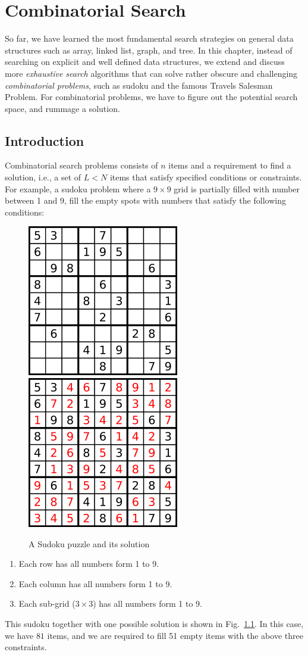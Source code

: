 \documentclass[../main.tex]{subfiles}
\begin{document}
\chapter{Combinatorial Search}
So far, we have learned the most fundamental search strategies on general data structures such as array, linked list, graph, and tree. In this chapter, instead of searching on explicit and well defined data structures, we extend and discuss more \textit{exhaustive search} algorithms that can solve rather obscure and challenging \textit{combinatorial problems}, such as sudoku and the famous Travels Salesman Problem. For combinatorial problems, we have to figure out the potential search space, and rummage a solution. 
\section{Introduction}
Combinatorial search problems consists of $n$ items and a requirement to find a solution, i.e., a set of $L < N$ items that satisfy specified conditions or constraints. For example, a sudoku problem where a $9\times 9$ grid is partially filled with number between 1 and 9, fill the empty spots with numbers that satisfy the following conditions:
\begin{figure}[!ht]
    \centering
    \includegraphics[width= 0.35\columnwidth]{fig/250px-Sudoku-by-L2G-20050714.png}
    \includegraphics[width= 0.35\columnwidth]{fig/250px-Sudoku-by-L2G-20050714_solution.png}
    \caption{A Sudoku puzzle and its solution}
    \label{fig:backtrack_puzzle_1}
\end{figure}
\begin{enumerate}
    \item Each row has all numbers form 1 to 9.
    \item Each column has all numbers form 1 to 9.
    \item Each sub-grid ($3 \times3$) has all numbers form 1 to 9.
\end{enumerate}
This sudoku together with one possible solution is shown in Fig.~\ref{fig:backtrack_puzzle_1}. In this case, we have $81$ items, and we are required to fill 51 empty items with the above three constraints. 
\end{document}
